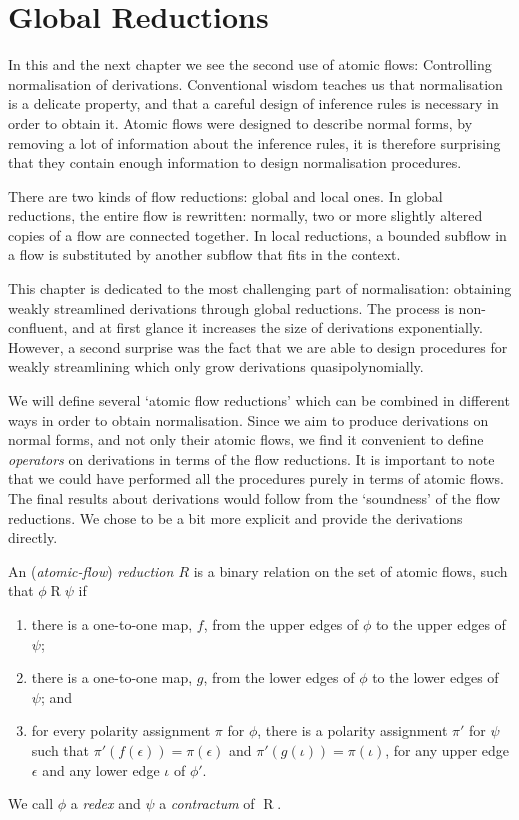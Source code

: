 \section{Global Reductions}\label{section:GlobalReductions}


In this and the next chapter we see the second use of atomic flows: Controlling normalisation of derivations. Conventional wisdom teaches us that normalisation is a delicate property, and that a careful design of inference rules is necessary in order to obtain it. Atomic flows were designed to describe normal forms, by removing a lot of information about the inference rules, it is therefore surprising that they contain enough information to design normalisation procedures.

There are two kinds of flow reductions: global and local ones. In global reductions, the entire flow is rewritten: normally, two or more slightly altered copies of a flow are connected together. In local reductions, a bounded subflow in a flow is substituted by another subflow that fits in the context.

This chapter is dedicated to the most challenging part of normalisation: obtaining weakly streamlined derivations through global reductions. The process is non-confluent, and at first glance it increases the size of derivations exponentially. However, a second surprise was the fact that we are able to design procedures for weakly streamlining which only grow derivations quasipolynomially.

We will define several `atomic flow reductions' which can be combined in different ways in order to obtain normalisation. Since we aim to produce derivations on normal forms, and not only their atomic flows, we find it convenient to define \emph{operators} on derivations in terms of the flow reductions. It is important to note that we could have performed all the procedures purely in terms of atomic flows. The final results about derivations would follow from the `soundness' of the flow reductions. We chose to be a bit more explicit and provide the derivations directly.

\begin{definition}\label{definition:FlowReduction}
An (\emph{atomic-flow}) \emph{reduction $R$} is a binary relation on the set of atomic flows, such that $\phi\mathrel{R}\psi$ if
\begin{enumerate}
\item
there is a one-to-one map, $f$, from the upper edges of $\phi$ to the upper edges of $\psi$;
\item
there is a one-to-one map, $g$, from the lower edges of $\phi$ to the lower edges of $\psi$; and
\item\label{definition:FlowReduction:item:Polarity}
for every polarity assignment $\pi$ for $\phi$, there is a polarity assignment $\pi'$ for $\psi$ such that $\pi'(f(\epsilon))=\pi(\epsilon)$ and $\pi'(g(\iota))=\pi(\iota)$, for any upper edge $\epsilon$ and any lower edge $\iota$ of $\phi'$.
\end{enumerate}
We call $\phi$ a \emph{redex} and $\psi$ a \emph{contractum} of $\mathrel R$.
\end{definition}


